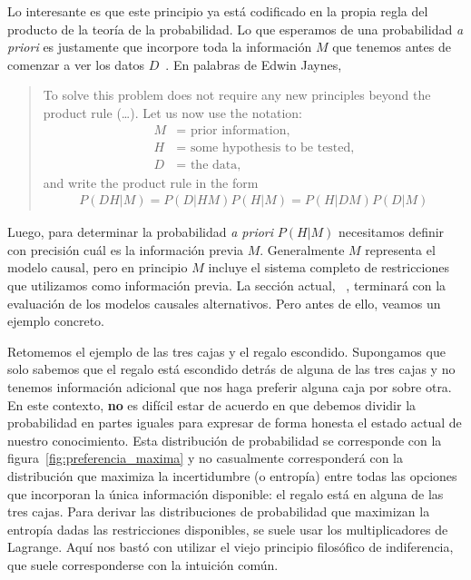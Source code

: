 \documentclass[a4paper,11pt]{book}
\theoremstyle{definition}
\begin{document}
%
Lo interesante es que este principio ya est\'a codificado en la propia regla del producto de la teor\'ia de la probabilidad.
%
Lo que esperamos de una probabilidad \emph{a priori} es justamente que incorpore toda la informaci\'on $M$ que tenemos antes de comenzar a ver los datos $D$~\cite{Jaynes2003}.
%
En palabras de Edwin Jaynes,
%
\begin{quotation}
To solve this problem does not require any new principles beyond the product rule (\dots). Let us now use the notation:
\begin{align*}
M &= \text{ prior information,} \\
H &= \text{ some hypothesis to be tested,} \\
D &= \text{ the data,}
\end{align*}
and write the product rule in the form
\begin{align}
P(DH|M) = P(D|HM)P(H|M) = P(H|DM)P(D|M)
\end{align}
\end{quotation}
%
Luego, para determinar la probabilidad \emph{a priori} $P(H|M)$ necesitamos definir con precisi\'on cu\'al es la informaci\'on previa $M$.
%
Generalmente $M$ representa el modelo causal, pero en principio $M$ incluye el sistema completo de restricciones que utilizamos como informaci\'on previa.
%
La secci\'on actual,~ \emph{}, terminar\'a con la evaluaci\'on de los modelos causales alternativos.
%
Pero antes de ello, veamos un ejemplo concreto.


Retomemos el ejemplo de las tres cajas y el regalo escondido.
Supongamos que solo sabemos que el regalo est\'a escondido detr\'as de alguna de las tres cajas y no tenemos informaci\'on adicional que nos haga preferir alguna caja por sobre otra.
%
En este contexto, \textbf{no} es dif\'icil estar de acuerdo en que debemos dividir la probabilidad en partes iguales para expresar de forma honesta el estado actual de nuestro conocimiento.
%
Esta distribuci\'on de probabilidad se corresponde con la figura~\ref{fig:preferencia_maxima} y no casualmente corresponder\'a con la distribuci\'on que maximiza la incertidumbre (o entrop\'ia) entre todas las opciones que incorporan la \'unica informaci\'on disponible: el regalo est\'a en alguna de las tres cajas.
%
Para derivar las distribuciones de probabilidad que maximizan la entrop\'ia dadas las restricciones disponibles, se suele usar los multiplicadores de Lagrange.
%
Aqu\'i nos bast\'o con utilizar el viejo principio filos\'ofico de indiferencia, que suele corresponderse con la intuici\'on com\'un.
\end{document}
